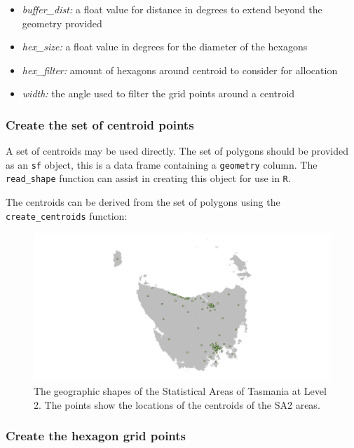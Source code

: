 \documentclass{monashthesis}
\begin{document}
\begin{itemize}
\tightlist
\item
  \emph{buffer\_dist:} a float value for distance in degrees to extend beyond the geometry provided
\item
  \emph{hex\_size:} a float value in degrees for the diameter of the hexagons
\item
  \emph{hex\_filter:} amount of hexagons around centroid to consider for allocation
\item
  \emph{width:} the angle used to filter the grid points around a centroid
\end{itemize}

\hypertarget{create-the-set-of-centroid-points}{%
\subsubsection{Create the set of centroid points}\label{create-the-set-of-centroid-points}}

A set of centroids may be used directly. The set of polygons should be provided as an \texttt{sf} object, this is a data frame containing a \texttt{geometry} column. The \texttt{read\_shape} function can assist in creating this object for use in \texttt{R}.

The centroids can be derived from the set of polygons using the \texttt{create\_centroids} function:

\begin{figure}[H]
\centering
\includegraphics[width=14cm]{figures/03-algorithm/1centroids.png}
\caption{\label{fig:centroids_plot}The geographic shapes of the Statistical Areas of Tasmania at Level 2. The points show the locations of the centroids of the SA2 areas.}
\end{figure}

\hypertarget{create-the-hexagon-grid-points}{%
\subsubsection{Create the hexagon grid points}\label{create-the-hexagon-grid-points}}
\end{document}
